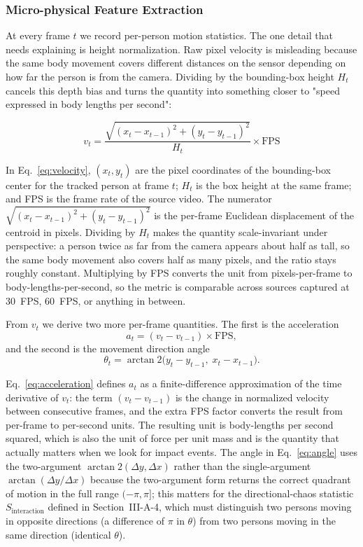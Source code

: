 \documentclass[conference]{IEEEtran}
\begin{document}
\subsubsection{Micro-physical Feature Extraction}
At every frame $t$ we record per-person motion statistics. The one detail that needs explaining is height normalization. Raw pixel velocity is misleading because the same body movement covers different distances on the sensor depending on how far the person is from the camera. Dividing by the bounding-box height $H_t$ cancels this depth bias and turns the quantity into something closer to "speed expressed in body lengths per second":

\begin{equation}
v_t = \frac{\sqrt{(x_t - x_{t-1})^2 + (y_t - y_{t-1})^2}}{H_t} \times \text{FPS}
\label{eq:velocity}
\end{equation}

\noindent In Eq.~\ref{eq:velocity}, $(x_t, y_t)$ are the pixel coordinates of the bounding-box center for the tracked person at frame $t$; $H_t$ is the box height at the same frame; and FPS is the frame rate of the source video. The numerator $\sqrt{(x_t-x_{t-1})^2+(y_t-y_{t-1})^2}$ is the per-frame Euclidean displacement of the centroid in pixels. Dividing by $H_t$ makes the quantity scale-invariant under perspective: a person twice as far from the camera appears about half as tall, so the same body movement also covers half as many pixels, and the ratio stays roughly constant. Multiplying by FPS converts the unit from pixels-per-frame to body-lengths-per-second, so the metric is comparable across sources captured at $30$~FPS, $60$~FPS, or anything in between.

From $v_t$ we derive two more per-frame quantities. The first is the acceleration
\begin{equation}
a_t = (v_t - v_{t-1}) \times \mathrm{FPS},
\label{eq:acceleration}
\end{equation}
and the second is the movement direction angle
\begin{equation}
\theta_t = \arctan\!2\bigl(y_t - y_{t-1},\; x_t - x_{t-1}\bigr).
\label{eq:angle}
\end{equation}

\noindent Eq.~\ref{eq:acceleration} defines $a_t$ as a finite-difference approximation of the time derivative of $v_t$: the term $(v_t - v_{t-1})$ is the change in normalized velocity between consecutive frames, and the extra FPS factor converts the result from per-frame to per-second units. The resulting unit is body-lengths per second squared, which is also the unit of force per unit mass and is the quantity that actually matters when we look for impact events. The angle in Eq.~\ref{eq:angle} uses the two-argument $\arctan\!2(\Delta y, \Delta x)$ rather than the single-argument $\arctan(\Delta y / \Delta x)$ because the two-argument form returns the correct quadrant of motion in the full range $(-\pi, \pi]$; this matters for the directional-chaos statistic $S_{\mathrm{interaction}}$ defined in Section~III-A-4, which must distinguish two persons moving in opposite directions (a difference of $\pi$ in $\theta$) from two persons moving in the same direction (identical $\theta$).
\end{document}
